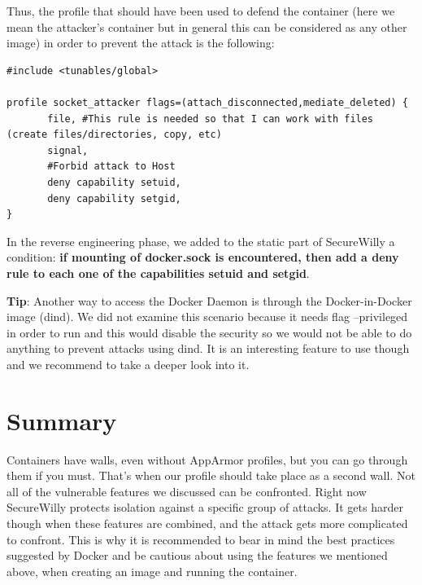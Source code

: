 Thus, the profile that should have been used to defend the container (here we mean the attacker's container but in general this can be considered as any other image) in order to prevent the attack is the following:

\begin{lstlisting}[style=Dockerfile, caption={AppArmor profile socket\_attacker}]
#include <tunables/global>

profile socket_attacker flags=(attach_disconnected,mediate_deleted) {
       file, #This rule is needed so that I can work with files (create files/directories, copy, etc)
       signal,
       #Forbid attack to Host
       deny capability setuid,
       deny capability setgid,
}
\end{lstlisting}


In the reverse engineering phase, we added to the static part of SecureWilly a condition: \textbf{if mounting of docker.sock is encountered, then add a deny rule to each one of the capabilities setuid and setgid}.

\begin{mdframed}[backgroundcolor=tipcolor]
\textbf{Tip}: Another way to access the Docker Daemon is through the Docker-in-Docker image (dind). We did not examine this scenario because it needs flag --privileged in order to run and this would disable the security so we would not be able to do anything to prevent attacks using dind. It is an interesting feature to use though and we recommend to take a deeper look into it. \cite{dind}
\end{mdframed}

\section{Summary}
Containers have walls, even without AppArmor profiles, but you can go through them if you must. That's when our profile should take place as a second wall. Not all of the vulnerable features we discussed can be confronted. Right now SecureWilly protects isolation against a specific group of attacks. It gets harder though when these features are combined, and the attack gets more complicated to confront. This is why it is recommended to bear in mind the best practices suggested by Docker \cite{dockerbestpr} and be cautious about using the features we mentioned above, when creating an image and running the container.
